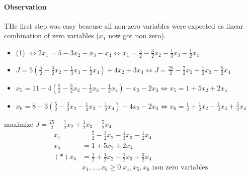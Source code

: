 \paragraph{Observation} THe first step was easy beacuse all non-zero variables were expected as linear combination of zero variables ($x_1$ now got non zero).
\begin{itemize}
	\item (1) $\Leftrightarrow 2x_1 = 5-3x_2 -x_3-x_4 \Leftrightarrow x_1 = \frac{5}{2} - \frac{3}{2}x_2 - \frac{1}{3}x_3 - \frac{1}{2}x_4$
	\item $J=5(\frac{5}{2} - \frac{3}{2}x_2 - \frac{1}{3}x_3 - \frac{1}{2}x_4) + 4x_2 + 3x_3 \Leftrightarrow J = \frac{25}{2} - \frac{7}{2}x_2 + \frac{1}{2}x_3 - \frac{5}{2}x_4$
	\item $x_5 = 11 - 4 (\frac{5}{2} - \frac{3}{2}x_2 - \frac{1}{3}x_3 - \frac{1}{2}x_4) - x_2 - 2x_3 \Leftrightarrow x_5 = 1 + 5x_2 + 2x_4$
	\item $x_6 = 8-3(\frac{5}{2} - \frac{3}{2}x_2 - \frac{1}{3}x_3 - \frac{1}{2}x_4) - 4x_2 - 2x_3 \Leftrightarrow x_6 = \frac{1}{2} + \frac{1}{2}x_2 - \frac{1}{2}x_3 + \frac{3}{2}x_4$
\end{itemize}
maximize $J = \frac{25}{2} - \frac{7}{2}x_2 + \frac{1}{2}x_3 - \frac{5}{2}x_4$
\begin{align*}
x_1 &= \frac{5}{2} - \frac{3}{2}x_2 - \frac{1}{3}x_3 - \frac{1}{2}x_4 \\
x_5 &= 1 + 5x_2 + 2x_4 \\
(*)x_6 &= \frac{1}{2} + \frac{1}{2}x_2 - \frac{1}{2}x_3 + \frac{3}{2}x_4 \\
&x_1,...,x_6 \geq 0. x_1,x_5,x_6 \text{ non zero variables}
\end{align*}
